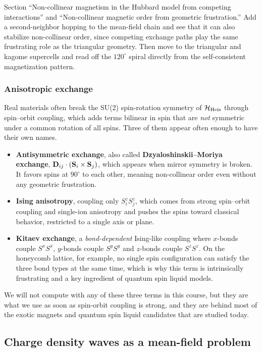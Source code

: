 \documentclass[lecture_notes.tex]{subfiles}
\begin{document}
\begin{notebook}
Section ``Non-collinear magnetism in the Hubbard model from competing interactions'' and
``Non-collinear magnetic order from geometric frustration.'' Add a second-neighbor hopping to
the mean-field chain and see that it can also stabilize non-collinear order, since competing
exchange paths play the same frustrating role as the triangular geometry. Then move to the
triangular and kagome supercells and read off the $120^\circ$ spiral directly from the
self-consistent magnetization pattern.
\end{notebook}

\subsubsection{Anisotropic exchange}
Real materials often break the SU(2) spin-rotation symmetry of
$\mathcal{H}_{\mathrm{Heis}}$ through spin--orbit coupling, which adds terms bilinear in spin that are
\emph{not} symmetric under a common rotation of all spins. Three of them appear often enough to
have their own names.
\begin{itemize}[nosep]
  \item \textbf{Antisymmetric exchange}, also called \textbf{Dzyaloshinskii--Moriya exchange},
    $\vb D_{ij}\cdot(\vb S_i\times
    \vb S_j)$, which appears when mirror symmetry is broken. It favors spins at
    $90^\circ$ to each other, meaning non-collinear order even without any geometric frustration.
  \item \textbf{Ising anisotropy}, coupling only $S_i^z S_j^z$, which comes from strong
    spin--orbit coupling and single-ion anisotropy and pushes the spins toward classical
    behavior, restricted to a single axis or plane.
  \item \textbf{Kitaev exchange}, a \emph{bond-dependent} Ising-like coupling where $x$-bonds
    couple $S^xS^x$, $y$-bonds couple $S^yS^y$ and $z$-bonds couple $S^zS^z$. On the honeycomb
    lattice, for example, no single spin configuration can satisfy the three bond types at the
    same time, which is why this term is intrinsically frustrating and a key ingredient of
    quantum spin liquid models.
\end{itemize}
We will not compute with any of these three terms in this course, but they are what we use as
soon as spin-orbit coupling is strong, and they are behind most of the exotic magnets and
quantum spin liquid candidates that are studied today.

\subsection{Charge density waves as a mean-field problem}
\end{document}
